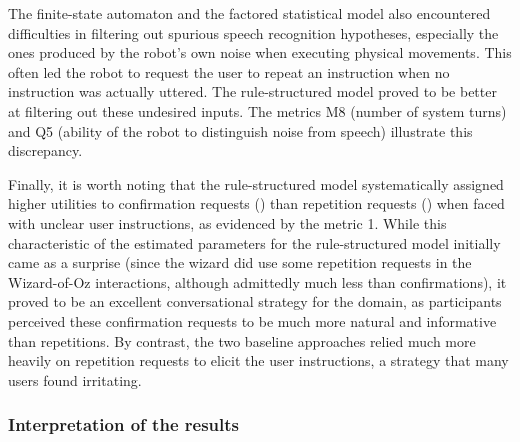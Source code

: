 The finite-state automaton and the factored statistical model also encountered difficulties in filtering out spurious speech recognition hypotheses, especially the ones produced by the robot's own noise when executing physical movements.  This often led the robot to request the user to repeat an instruction when no instruction was actually uttered.  The rule-structured model proved to be better at filtering out these undesired inputs.  The metrics M8 (number of system turns) and Q5 (ability of the robot to distinguish noise from speech) illustrate this discrepancy. 

Finally, it is worth noting that the rule-structured model systematically assigned higher utilities to confirmation requests () than repetition requests () when faced with unclear user instructions, as evidenced by the metric 1. While this characteristic of the estimated parameters for the rule-structured model initially came as a surprise (since the wizard did use some repetition requests in the Wizard-of-Oz interactions, although admittedly much less than confirmations), it proved to be an excellent conversational strategy for the domain, as participants perceived these confirmation requests to be much more natural and informative than repetitions. By contrast, the two baseline approaches relied much more heavily on repetition requests to elicit the user instructions, a strategy that many users found irritating. 

\subsubsection*{Interpretation of the results}


